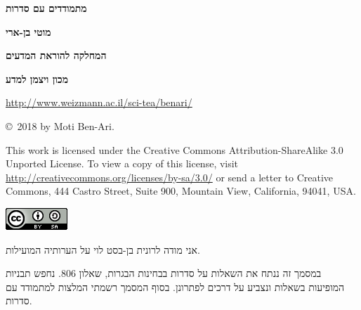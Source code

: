 \documentclass[12pt,a4paper]{article}
\begin{document}
\thispagestyle{empty}


\begin{center}
\textbf{\Huge מתמודדים עם סדרות}

\bigskip
\bigskip

\textbf{\Large מוטי בן-ארי}

\bigskip

\textbf{\Large המחלקה להוראת המדעים}

\bigskip

\textbf{\Large מכון ויצמן למדע}

\bigskip

\url{http://www.weizmann.ac.il/sci-tea/benari/}

\bigskip

\end{center}


\begin{center}
\sffamily\copyright{}\  2018 by Moti Ben-Ari.
\end{center}

\begin{footnotesize}
\sffamily
This work is licensed under the Creative Commons Attribution-ShareAlike 3.0 Unported License. To view a copy of this license, visit \url{http://creativecommons.org/licenses/by-sa/3.0/} or send a letter to Creative Commons, 444 Castro Street, Suite 900, Mountain View, California, 94041, USA.
\end{footnotesize}

\bigskip

\begin{center}
\includegraphics[width=.2\textwidth]{../by-sa.png}
\end{center}

\bigskip
\bigskip
\bigskip


אני מודה לרונית בן-בסט לוי על הערותיה המועילות.
\newpage


במסמך זה ננתח את השאלות על סדרות בבחינות הבגרות, שאלון
$806$.
נחפש תבניות המופיעות בשאלות ונצביע על דרכים לפתרונן. בסוף המסמך רשמתי המלצות למתמודד עם סדרות.


\end{document}
